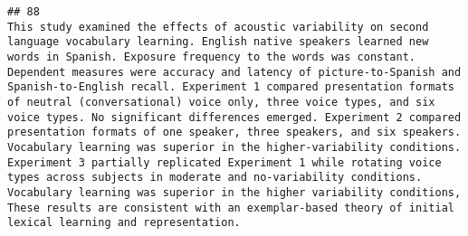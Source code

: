 \documentclass[
  english,
  man]{apa6}
\begin{document}
\begin{verbatim}
## 88                                                                                                                                                                                                                                                                                                                                                                                                                                                                                                                                                                                                                                                                                                                                                                                                                                                                                                                                                                                                                                                                                                                                                                                                                                                                                                                                                                                                                                                                                                                                                                                                                                                                                                           This study examined the effects of acoustic variability on second language vocabulary learning. English native speakers learned new words in Spanish. Exposure frequency to the words was constant. Dependent measures were accuracy and latency of picture-to-Spanish and Spanish-to-English recall. Experiment 1 compared presentation formats of neutral (conversational) voice only, three voice types, and six voice types. No significant differences emerged. Experiment 2 compared presentation formats of one speaker, three speakers, and six speakers. Vocabulary learning was superior in the higher-variability conditions. Experiment 3 partially replicated Experiment 1 while rotating voice types across subjects in moderate and no-variability conditions. Vocabulary learning was superior in the higher variability conditions, These results are consistent with an exemplar-based theory of initial lexical learning and representation.

\end{verbatim}
\end{document}
